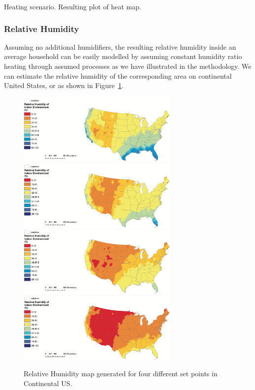 Heating scenario. Resulting plot of heat map. 
\subsubsection{Relative Humidity}
	Assuming no additional humidifiers, the resulting relative humidity inside an average household can be easily modelled by assuming constant humidity ratio heating through assumed processes as we have illustrated in the methodology. We can estimate the relative humidity of the corresponding area on continental United States, or as shown in Figure~\ref{fg:RHmap}. 

	\begin{figure}[h!]
	\centering
	\includegraphics[width=0.7\textwidth]{heat62.png}\\
	\includegraphics[width=0.7\textwidth]{heat68.png}\\
	\includegraphics[width=0.7\textwidth]{heat74.png}\\
	\includegraphics[width=0.7\textwidth]{heat80.png}
	\caption{Relative Humidity map generated for four different set points in Continental US.}\label{fg:RHmap}
	\end{figure}

